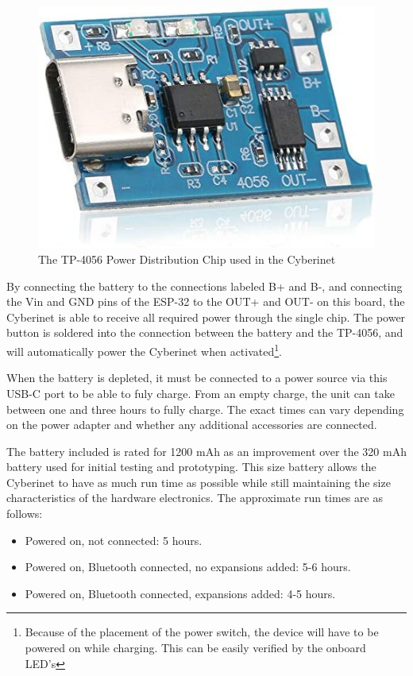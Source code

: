 \begin{center}
    \begin{figure}
        \centering
        \includegraphics[scale=0.5]{diagrams/oem/4056.jpg}
        \caption{The TP-4056 Power Distribution Chip used in the Cyberinet}
        \label{fig:tp5046}
    \end{figure}
\end{center}

By connecting the battery to the connections labeled B+ and B-, and connecting the Vin and GND pins of the ESP-32 to the OUT+ and OUT- on this board, the Cyberinet is able to receive all required power through the single chip. The power button is soldered into the connection between the battery and the TP-4056, and will automatically power the Cyberinet when activated\footnote{Because of the placement of the power switch, the device will have to be powered on while charging. This can be easily verified by the onboard LED's}. 

When the battery is depleted, it must be connected to a power source via this USB-C port to be able to fuly charge. From an empty charge, the unit can take between one and three hours to fully charge. The exact times can vary depending on the power adapter and whether any additional accessories are connected. 

The battery included is rated for 1200 mAh as an improvement over the 320 mAh battery used for initial testing and prototyping. This size battery allows the Cyberinet to have as much run time as possible while still maintaining the size characteristics of the hardware electronics. The approximate run times are as follows:

\begin{itemize}
    \item Powered on, not connected: 5 hours.
    \item Powered on, Bluetooth connected, no expansions added: 5-6 hours.
    \item Powered on, Bluetooth connected, expansions added: 4-5 hours.
\end{itemize}


